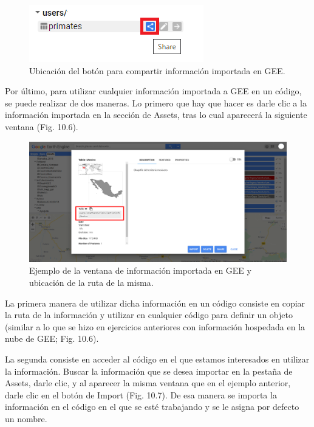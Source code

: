 \documentclass[
  12pt,
  letterpaper,
  twoside]{book}
\begin{document}
\begin{figure}[btp]

{\centering \includegraphics[width=0.3\linewidth]{Img/shareAssets} 

}

\caption{Ubicación del botón para compartir información importada en GEE.}\label{fig:unnamed-chunk-178}
\end{figure}

Por último, para utilizar cualquier información importada a GEE en un código, se puede realizar de dos maneras. Lo primero que hay que hacer es darle clic a la información importada en la sección de Assets, tras lo cual aparecerá la siguiente ventana (Fig. 10.6).

\begin{figure}[btp]

{\centering \includegraphics[width=1\linewidth]{Img/Asset_ruta} 

}

\caption{Ejemplo de la ventana de información importada en GEE y ubicación de la ruta de la misma.}\label{fig:unnamed-chunk-179}
\end{figure}

La primera manera de utilizar dicha información en un código consiste en copiar la ruta de la información y utilizar en cualquier código para definir un objeto (similar a lo que se hizo en ejercicios anteriores con información hospedada en la nube de GEE; Fig. 10.6).

La segunda consiste en acceder al código en el que estamos interesados en utilizar la información. Buscar la información que se desea importar en la pestaña de Assets, darle clic, y al aparecer la misma ventana que en el ejemplo anterior, darle clic en el botón de Import (Fig. 10.7). De esa manera se importa la información en el código en el que se esté trabajando y se le asigna por defecto un nombre.
\end{document}
